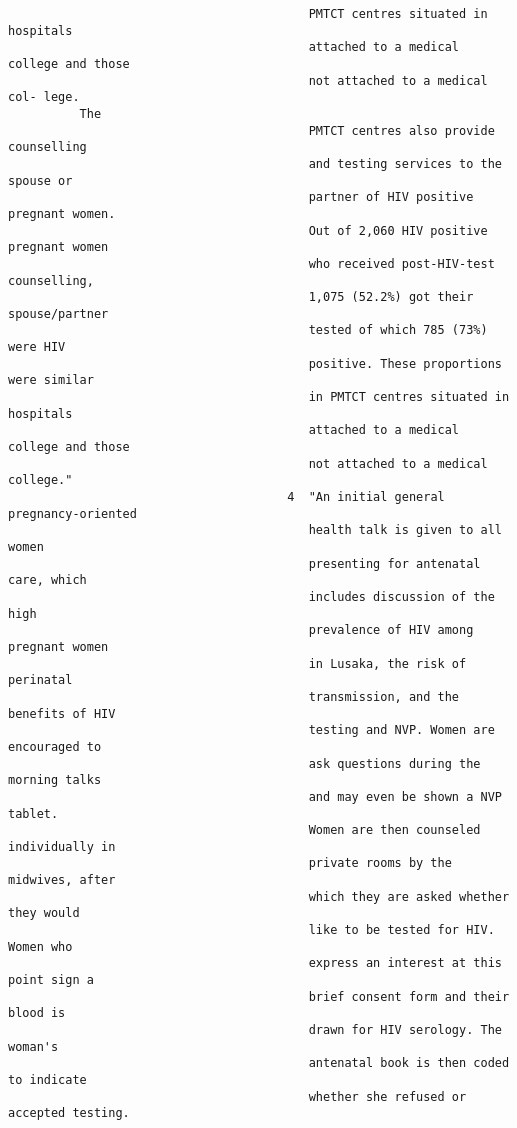 \documentclass{article}
\begin{document}
\begin{verbatim}
                                          PMTCT centres situated in hospitals
                                          attached to a medical college and those
                                          not attached to a medical col- lege.
          The
                                          PMTCT centres also provide counselling
                                          and testing services to the spouse or
                                          partner of HIV positive pregnant women.
                                          Out of 2,060 HIV positive pregnant women
                                          who received post-HIV-test counselling,
                                          1,075 (52.2%) got their spouse/partner
                                          tested of which 785 (73%) were HIV
                                          positive. These proportions were similar
                                          in PMTCT centres situated in hospitals
                                          attached to a medical college and those
                                          not attached to a medical college."
                                       4  "An initial general pregnancy-oriented
                                          health talk is given to all women
                                          presenting for antenatal care, which
                                          includes discussion of the high
                                          prevalence of HIV among pregnant women
                                          in Lusaka, the risk of perinatal
                                          transmission, and the benefits of HIV
                                          testing and NVP. Women are encouraged to
                                          ask questions during the morning talks
                                          and may even be shown a NVP tablet.
                                          Women are then counseled individually in
                                          private rooms by the midwives, after
                                          which they are asked whether they would
                                          like to be tested for HIV. Women who
                                          express an interest at this point sign a
                                          brief consent form and their blood is
                                          drawn for HIV serology. The woman's
                                          antenatal book is then coded to indicate
                                          whether she refused or accepted testing.

\end{verbatim}
\end{document}
